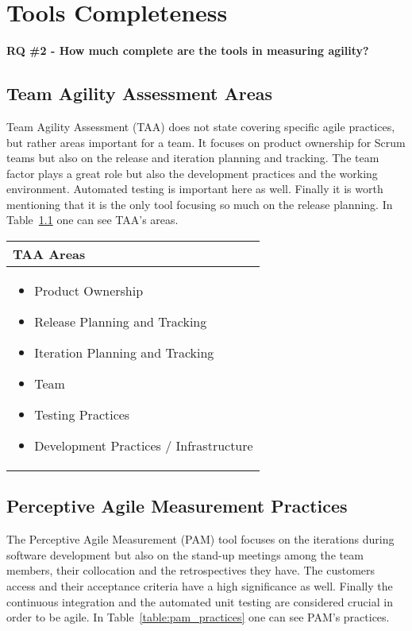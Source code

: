 \chapter{Tools Completeness}
\label{ch:tools_completness}

\textbf{RQ \#2 - How much complete are the tools in measuring agility?}

\section{Team Agility Assessment Areas}
Team Agility Assessment (TAA) does not state covering specific agile practices, but rather areas important for a team. It focuses on product ownership for Scrum teams but also on the release and iteration planning and tracking. The team factor plays a great role but also the development practices and the working environment. Automated testing is important here as well. Finally it is worth mentioning that it is the only tool focusing so much on the release planning. In Table~\ref{table:taa_practices} one can see TAA's areas.

\begin{table} [H]
  \begin{tabular}{| p{6.8cm} |}
    \hline
     \textbf{TAA Areas}\\ \hline
     \begin{itemize} \item Product Ownership \item Release Planning and Tracking \item Iteration Planning and Tracking \item Team \item Testing Practices \item Development Practices / Infrastructure \end{itemize}  \\ \hline
  \end{tabular}
  \label{table:taa_practices}
\end{table}

\section[PAM Practices]{Perceptive Agile Measurement Practices}
The Perceptive Agile Measurement (PAM) tool focuses on the iterations during software development but also on the stand-up meetings among the team members, their collocation and the retrospectives they have. The customers access and their acceptance criteria have a high significance as well. Finally the continuous integration and the automated unit testing are considered crucial in order to be agile. In Table~\ref{table:pam_practices} one can see PAM's practices.

